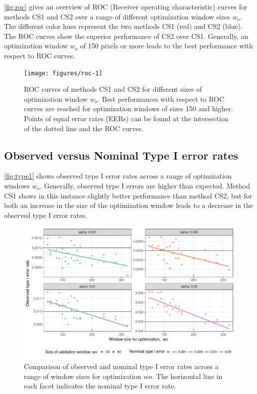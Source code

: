 \documentclass[12pt]{article}
\begin{document}
\autoref{fig:roc} gives an overview of ROC (Receiver operating
characteristic) curves for methods CS1 and CS2 over a range of different
optimization window sizes \(w_o\). The different color hues represent
the two methods CS1 (red) and CS2 (blue). The ROC curves show the
superior performance of CS2 over CS1. Generally, an optimization window
\(w_o\) of 150 pixels or more leads to the best performance with respect
to ROC curves.

\begin{figure}

{\centering \texttt{[image: figures/roc-1]} 

}

\caption{ROC curves of methods CS1 and CS2 for different sizes of optimization window $w_o$. Best performances with respect to  ROC curves are reached for optimization windows of sizes 150 and higher. Points of equal error rates (EERs) can be found at the intersection of the dotted line and the ROC curves.}\label{fig:roc}
\end{figure}

\subsection{Observed versus Nominal Type I error
rates}\label{observed-versus-nominal-type-i-error-rates}

\autoref{fig:type1} shows observed type I error rates across a range of
optimization windows \(w_o\). Generally, observed type I errors are
higher than expected. Method CS1 shows in this instance slightly better
performance than method CS2, but for both an increase in the size of the
optimization window leads to a decrease in the observed type I error
rates.

\begin{figure}

{\centering \includegraphics[width=\textwidth]{figures/type1-1} 

}

\caption{Comparison of observed and nominal type I error rates  across a range of window sizes for optimization $wo$. The horizontal line in each facet indicates the nominal type I error rate.}\label{fig:type1}
\end{figure}
\end{document}
